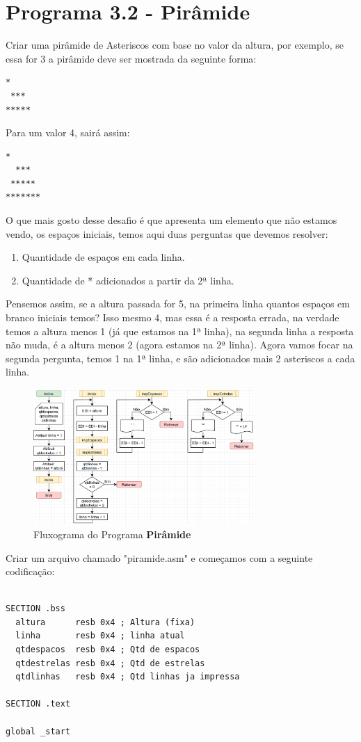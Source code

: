 \section{Programa 3.2 - Pirâmide}
Criar uma pirâmide de Asteriscos com base no valor da altura, por exemplo, se essa for 3 a pirâmide deve ser mostrada da seguinte forma:
\begin{lstlisting}[]
  *
 ***
*****
\end{lstlisting}

Para um valor 4, sairá assim:
\begin{lstlisting}[]
   *
  ***
 *****
*******
\end{lstlisting}

O que mais gosto desse desafio é que apresenta um elemento que não estamos vendo, os espaços iniciais, temos aqui duas perguntas que devemos resolver:
\begin{enumerate}[nolistsep]
	\item Quantidade de espaços em cada linha.
	\item Quantidade de * adicionados a partir da 2ª linha.
\end{enumerate}

Pensemos assim, se a altura passada for 5, na primeira linha quantos espaços em branco iniciais temos? Isso mesmo 4, mas essa é a resposta errada, na verdade temos a altura menos 1 (já que estamos na 1ª linha), na segunda linha a resposta não muda, é a altura menos 2 (agora estamos na 2ª linha). Agora vamos focar na segunda pergunta, temos 1 na 1ª linha, e são adicionados mais 2 asteriscos a cada linha.

\begin{figure}[H]
	\centering
	\includegraphics[width=0.75\textwidth]{Pictures/cap03/programa32}
	\caption{Fluxograma do Programa \textbf{Pirâmide}}
\end{figure}

Criar um arquivo chamado "piramide.asm" e começamos com a seguinte codificação:
\begin{lstlisting}[]
%include 'bibliotecaE.inc'

SECTION .bss
  altura      resb 0x4 ; Altura (fixa)
  linha       resb 0x4 ; linha atual
  qtdespacos  resb 0x4 ; Qtd de espacos
  qtdestrelas resb 0x4 ; Qtd de estrelas
  qtdlinhas   resb 0x4 ; Qtd linhas ja impressa

SECTION .text

global _start
\end{lstlisting}

